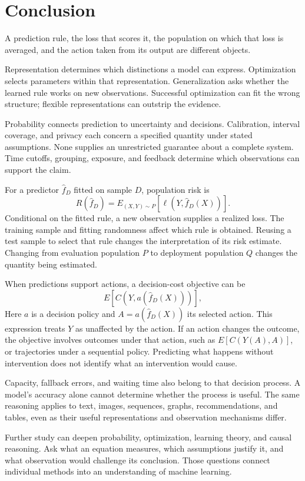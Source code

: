 \chapter*{Conclusion}

A prediction rule, the loss that scores it, the population on which that loss is averaged, and the action taken from its output are different objects.

Representation determines which distinctions a model can express. Optimization selects parameters within that representation. Generalization asks whether the learned rule works on new observations. Successful optimization can fit the wrong structure; flexible representations can outstrip the evidence.

Probability connects prediction to uncertainty and decisions. Calibration, interval coverage, and privacy each concern a specified quantity under stated assumptions. None supplies an unrestricted guarantee about a complete system. Time cutoffs, grouping, exposure, and feedback determine which observations can support the claim.

For a predictor $\hat f_D$ fitted on sample $D$, population risk is
\[
R(\hat f_D)=E_{(X,Y)\sim P}[\ell(Y,\hat f_D(X))].
\]
Conditional on the fitted rule, a new observation supplies a realized loss. The training sample and fitting randomness affect which rule is obtained. Reusing a test sample to select that rule changes the interpretation of its risk estimate. Changing from evaluation population $P$ to deployment population $Q$ changes the quantity being estimated.

When predictions support actions, a decision-cost objective can be
\[
E[C(Y,a(\hat f_D(X)))],
\]
Here $a$ is a decision policy and $A=a(\hat f_D(X))$ its selected action. This expression treats $Y$ as unaffected by the action. If an action changes the outcome, the objective involves outcomes under that action, such as $E[C(Y(A),A)]$, or trajectories under a sequential policy. Predicting what happens without intervention does not identify what an intervention would cause.

Capacity, fallback errors, and waiting time also belong to that decision process. A model's accuracy alone cannot determine whether the process is useful. The same reasoning applies to text, images, sequences, graphs, recommendations, and tables, even as their useful representations and observation mechanisms differ.

Further study can deepen probability, optimization, learning theory, and causal reasoning. Ask what an equation measures, which assumptions justify it, and what observation would challenge its conclusion. Those questions connect individual methods into an understanding of machine learning.

\clearpage
{\pagestyle{empty}\cleardoublepage}
